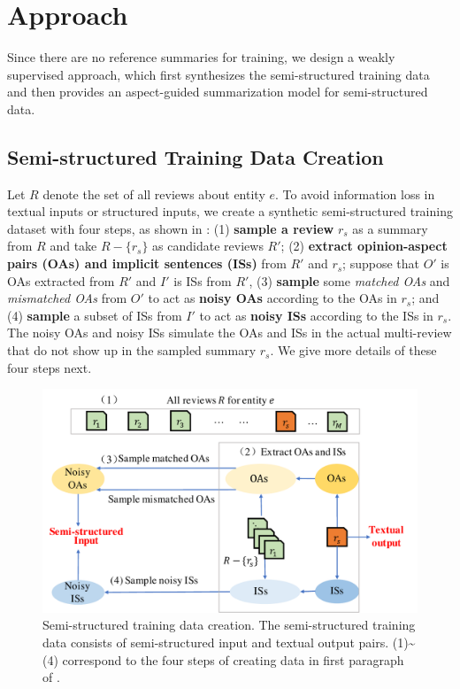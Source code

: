 \section{Approach}
\label{sec:approach}
Since there are no reference summaries for training,
we design a weakly supervised approach, 
which first synthesizes the semi-structured training data and 
then provides an aspect-guided summarization model for semi-structured data.

\subsection{Semi-structured Training Data Creation}
\label{sec:data}
Let $R$ denote the set of all reviews about entity $e$.
To avoid information loss in textual inputs or structured inputs,
we create a synthetic semi-structured training dataset %
with four steps, 
as shown in :
(1) \textbf{sample a review} $r_s$ as a summary from $R$ and take $R - \{r_s\}$ as candidate reviews $R'$; 
(2) \textbf{extract opinion-aspect pairs (OAs) and implicit sentences (ISs)} from $R'$ and $r_s$;
suppose that $O'$ is OAs extracted from $R'$ and
$I'$ is ISs from $R'$, 
(3) {\bf sample} some {\em matched OAs} and {\em mismatched OAs} from $O'$ to act as \textbf{noisy OAs} according to the OAs in $r_s$;
and (4) {\bf sample} a subset of ISs from $I'$ to act as \textbf{noisy ISs} according to the ISs in $r_s$. 
The noisy OAs and noisy ISs simulate the OAs and ISs in the actual multi-review that do not show up in the sampled summary $r_s$.
We give more details of these four steps next.

\begin{figure}[th]
	\centering
	\includegraphics[width=1.0\linewidth]{./dm.pdf}
	\caption{Semi-structured training data creation.  
The semi-structured training data consists of semi-structured input and textual output pairs. (1)\textasciitilde(4) correspond to the four steps of creating data in first paragraph of .}
	\label{fig:dm}
\end{figure}


